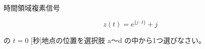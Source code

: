 時間領域複素信号 

\[
z(t) = \textrm{e}^{\{j \cdot t \}} + j
\]

\medskip
\noindent の $t = 0$ [秒]地点の位置を選択肢 a〜d の中から1つ選びなさい。
